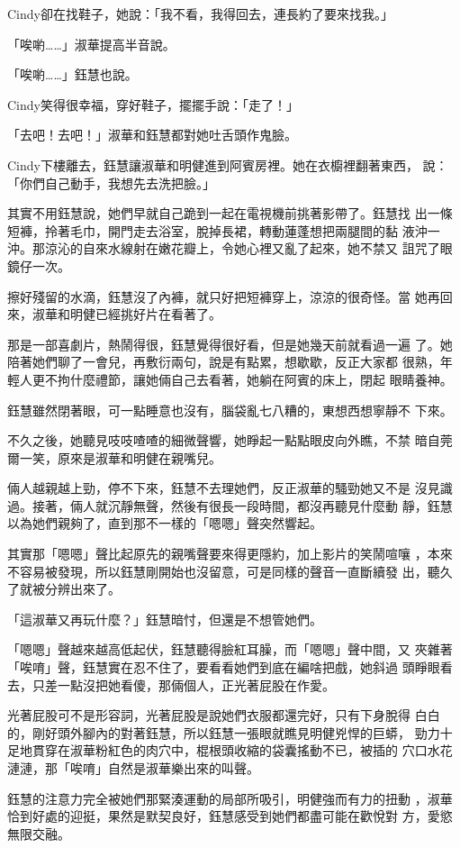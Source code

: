 Cindy卻在找鞋子，她說：「我不看，我得回去，連長約了要來找我。」

「唉喲……」淑華提高半音說。

「唉喲……」鈺慧也說。

Cindy笑得很幸福，穿好鞋子，擺擺手說：「走了！」

「去吧！去吧！」淑華和鈺慧都對她吐舌頭作鬼臉。

Cindy下樓離去，鈺慧讓淑華和明健進到阿賓房裡。她在衣櫥裡翻著東西，
說：「你們自己動手，我想先去洗把臉。」

其實不用鈺慧說，她們早就自己跪到一起在電視機前挑著影帶了。鈺慧找
出一條短褲，拎著毛巾，開門走去浴室，脫掉長裙，轉動蓮蓬想把兩腿間的黏
液沖一沖。那涼沁的自來水線射在嫩花瓣上，令她心裡又亂了起來，她不禁又
詛咒了眼鏡仔一次。

擦好殘留的水滴，鈺慧沒了內褲，就只好把短褲穿上，涼涼的很奇怪。當
她再回來，淑華和明健已經挑好片在看著了。

那是一部喜劇片，熱鬧得很，鈺慧覺得很好看，但是她幾天前就看過一遍
了。她陪著她們聊了一會兒，再敷衍兩句，說是有點累，想歇歇，反正大家都
很熟，年輕人更不拘什麼禮節，讓她倆自己去看著，她躺在阿賓的床上，閉起
眼睛養神。

鈺慧雖然閉著眼，可一點睡意也沒有，腦袋亂七八糟的，東想西想寧靜不
下來。

不久之後，她聽見吱吱喳喳的細微聲響，她睜起一點點眼皮向外瞧，不禁
暗自莞爾一笑，原來是淑華和明健在親嘴兒。

倆人越親越上勁，停不下來，鈺慧不去理她們，反正淑華的騷勁她又不是
沒見識過。接著，倆人就沉靜無聲，然後有很長一段時間，都沒再聽見什麼動
靜，鈺慧以為她們親夠了，直到那不一樣的「嗯嗯」聲突然響起。

其實那「嗯嗯」聲比起原先的親嘴聲要來得更隱約，加上影片的笑鬧喧嚷
，本來不容易被發現，所以鈺慧剛開始也沒留意，可是同樣的聲音一直斷續發
出，聽久了就被分辨出來了。

「這淑華又再玩什麼？」鈺慧暗忖，但還是不想管她們。

「嗯嗯」聲越來越高低起伏，鈺慧聽得臉紅耳臊，而「嗯嗯」聲中間，又
夾雜著「唉唷」聲，鈺慧實在忍不住了，要看看她們到底在編啥把戲，她斜過
頭睜眼看去，只差一點沒把她看傻，那倆個人，正光著屁股在作愛。

光著屁股可不是形容詞，光著屁股是說她們衣服都還完好，只有下身脫得
白白的，剛好頭外腳內的對著鈺慧，所以鈺慧一張眼就瞧見明健兇悍的巨蟒，
勁力十足地貫穿在淑華粉紅色的肉穴中，棍根頭收縮的袋囊搖動不已，被插的
穴口水花漣漣，那「唉唷」自然是淑華樂出來的叫聲。

鈺慧的注意力完全被她們那緊湊運動的局部所吸引，明健強而有力的扭動
，淑華恰到好處的迎挺，果然是默契良好，鈺慧感受到她們都盡可能在歡悅對
方，愛慾無限交融。

